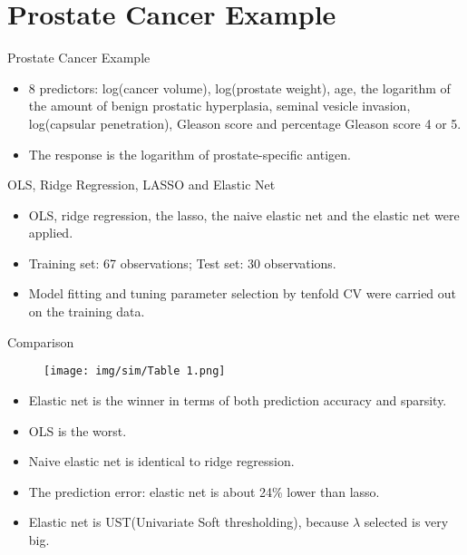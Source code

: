 
\section{Prostate Cancer Example}

    \begin{frame}{Prostate Cancer Example}
        \begin{itemize}
            \item 8 predictors: log(cancer volume), log(prostate weight), age, the logarithm of the amount of benign prostatic hyperplasia, seminal vesicle invasion, log(capsular penetration), Gleason score and percentage Gleason score 4 or 5.
            \item The response is the logarithm of prostate-specific antigen.
        \end{itemize}
        
    \end{frame}

    \begin{frame}{OLS, Ridge Regression, LASSO and Elastic Net}
        \begin{itemize}
            \item OLS, ridge regression, the lasso, the naive elastic net and the elastic net were applied.
            \item Training set: 67 observations; Test set: 30 observations.
            \item Model fitting and tuning parameter selection by tenfold CV were carried out on the training data.
        \end{itemize}
    \end{frame}

    \begin{frame}{Comparison}
        \begin{figure}
            \centering
            \texttt{[image: img/sim/Table 1.png]}
            \label{fig:enter-label}
        \end{figure}
        \begin{itemize}
            \item Elastic net is the winner in terms of both prediction accuracy and sparsity.
            \item OLS is the worst.
            \item Naive elastic net is identical to ridge regression.
            \item The prediction error: elastic net is about 24\% lower than lasso.
            \item Elastic net is UST(Univariate Soft thresholding), because $\lambda$ selected is very big.
        \end{itemize}
    \end{frame}
